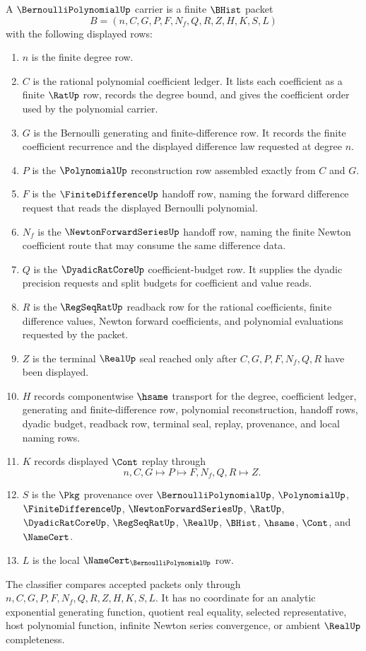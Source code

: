 \begin{definition}
\label{def:bernoulli-polynomial-carrier}
A $\BernoulliPolynomialUp$ carrier is a finite $\BHist$ packet
$$
B=(n,C,G,P,F,N_f,Q,R,Z,H,K,S,L)
$$
with the following displayed rows:
\begin{enumerate}
\item $n$ is the finite degree row.
\item $C$ is the rational polynomial coefficient ledger. It lists each coefficient as a finite $\RatUp$ row, records the degree bound, and gives the coefficient order used by the polynomial carrier.
\item $G$ is the Bernoulli generating and finite-difference row. It records the finite coefficient recurrence and the displayed difference law requested at degree $n$.
\item $P$ is the $\PolynomialUp$ reconstruction row assembled exactly from $C$ and $G$.
\item $F$ is the $\FiniteDifferenceUp$ handoff row, naming the forward difference request that reads the displayed Bernoulli polynomial.
\item $N_f$ is the $\NewtonForwardSeriesUp$ handoff row, naming the finite Newton coefficient route that may consume the same difference data.
\item $Q$ is the $\DyadicRatCoreUp$ coefficient-budget row. It supplies the dyadic precision requests and split budgets for coefficient and value reads.
\item $R$ is the $\RegSeqRatUp$ readback row for the rational coefficients, finite difference values, Newton forward coefficients, and polynomial evaluations requested by the packet.
\item $Z$ is the terminal $\RealUp$ seal reached only after $C,G,P,F,N_f,Q,R$ have been displayed.
\item $H$ records componentwise $\hsame$ transport for the degree, coefficient ledger, generating and finite-difference row, polynomial reconstruction, handoff rows, dyadic budget, readback row, terminal seal, replay, provenance, and local naming rows.
\item $K$ records displayed $\Cont$ replay through
$$
n,C,G \longmapsto P \longmapsto F,N_f,Q,R \longmapsto Z .
$$
\item $S$ is the $\Pkg$ provenance over $\BernoulliPolynomialUp$, $\PolynomialUp$, $\FiniteDifferenceUp$, $\NewtonForwardSeriesUp$, $\RatUp$, $\DyadicRatCoreUp$, $\RegSeqRatUp$, $\RealUp$, $\BHist$, $\hsame$, $\Cont$, and $\NameCert$.
\item $L$ is the local $\NameCert_{\BernoulliPolynomialUp}$ row.
\end{enumerate}
The classifier compares accepted packets only through $n,C,G,P,F,N_f,Q,R,Z,H,K,S,L$. It has no coordinate for an analytic exponential generating function, quotient real equality, selected representative, host polynomial function, infinite Newton series convergence, or ambient $\RealUp$ completeness.
\end{definition}

